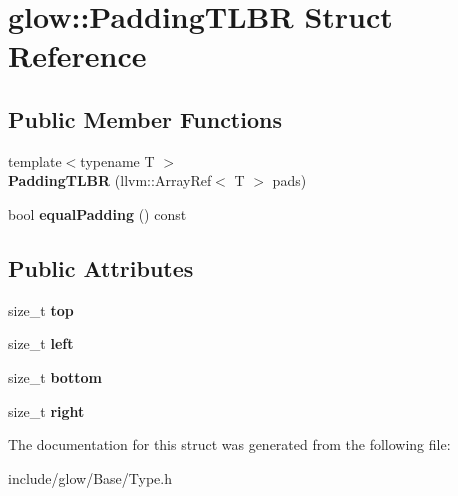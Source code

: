 \hypertarget{structglow_1_1_padding_t_l_b_r}{}\section{glow\+:\+:Padding\+T\+L\+BR Struct Reference}
\label{structglow_1_1_padding_t_l_b_r}
\subsection*{Public Member Functions}
\begin{DoxyCompactItemize}
\item 
\mbox{\label{structglow_1_1_padding_t_l_b_r_afac5e126dbf18d3b05762bf5aebe7c6f}} 
{\footnotesize template$<$typename T $>$ }\\{\bfseries Padding\+T\+L\+BR} (llvm\+::\+Array\+Ref$<$ T $>$ pads)
\item 
\mbox{\label{structglow_1_1_padding_t_l_b_r_a0b1ae5b0f89ff0d0144d8635d3cbd33b}} 
bool {\bfseries equal\+Padding} () const
\end{DoxyCompactItemize}
\subsection*{Public Attributes}
\begin{DoxyCompactItemize}
\item 
\mbox{\label{structglow_1_1_padding_t_l_b_r_aa3d414c6b851e4609c69f1e311b92339}} 
size\+\_\+t {\bfseries top}
\item 
\mbox{\label{structglow_1_1_padding_t_l_b_r_ab3cbc1b366731d7f0b80eeb09afc6954}} 
size\+\_\+t {\bfseries left}
\item 
\mbox{\label{structglow_1_1_padding_t_l_b_r_a8410ab671a8abcb34e81b07bcd895fd8}} 
size\+\_\+t {\bfseries bottom}
\item 
\mbox{\label{structglow_1_1_padding_t_l_b_r_a8271617403626f5808de86815a6c34f1}} 
size\+\_\+t {\bfseries right}
\end{DoxyCompactItemize}


The documentation for this struct was generated from the following file\+:\begin{DoxyCompactItemize}
\item 
include/glow/\+Base/Type.\+h\end{DoxyCompactItemize}
